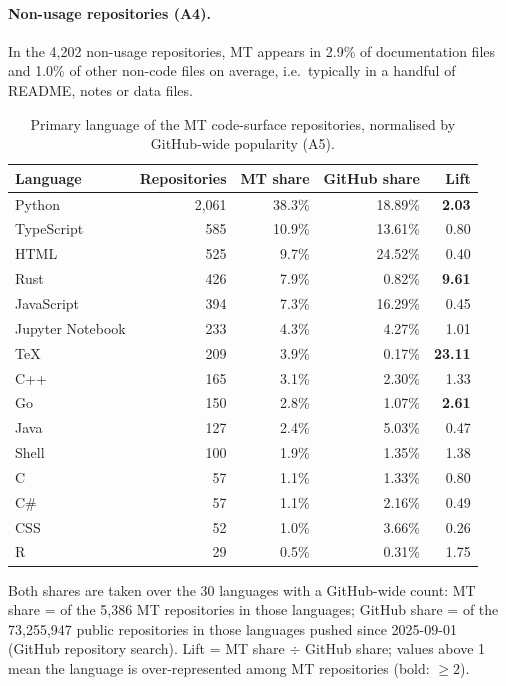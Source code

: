 \documentclass[11pt,a4paper]{article}
\begin{document}
\paragraph{Non-usage repositories (A4).} In the 4,202 non-usage repositories, MT appears in 2.9\% of documentation files and 1.0\% of other non-code files on average, i.e.\ typically in a handful of README, notes or data files.

\begin{table}[htbp]
\centering
\small
\caption{Primary language of the MT code-surface repositories, normalised by GitHub-wide popularity (A5).}
\label{tab:mt-a5}
\begin{tabular}{@{}lrrrr@{}}
\toprule
Language & Repositories & MT share & GitHub share & Lift \\
\midrule
Python & 2,061 & 38.3\% & 18.89\% & \textbf{2.03} \\
TypeScript & 585 & 10.9\% & 13.61\% & 0.80 \\
HTML & 525 & 9.7\% & 24.52\% & 0.40 \\
Rust & 426 & 7.9\% & 0.82\% & \textbf{9.61} \\
JavaScript & 394 & 7.3\% & 16.29\% & 0.45 \\
Jupyter Notebook & 233 & 4.3\% & 4.27\% & 1.01 \\
TeX & 209 & 3.9\% & 0.17\% & \textbf{23.11} \\
C++ & 165 & 3.1\% & 2.30\% & 1.33 \\
Go & 150 & 2.8\% & 1.07\% & \textbf{2.61} \\
Java & 127 & 2.4\% & 5.03\% & 0.47 \\
Shell & 100 & 1.9\% & 1.35\% & 1.38 \\
C & 57 & 1.1\% & 1.33\% & 0.80 \\
C\# & 57 & 1.1\% & 2.16\% & 0.49 \\
CSS & 52 & 1.0\% & 3.66\% & 0.26 \\
R & 29 & 0.5\% & 0.31\% & 1.75 \\
\bottomrule
\end{tabular}
\par\smallskip\parbox{0.94\linewidth}{\footnotesize Both shares are taken over the 30 languages with a GitHub-wide count: MT share = of the 5,386 MT repositories in those languages; GitHub share = of the 73,255,947 public repositories in those languages pushed since 2025-09-01 (GitHub repository search). Lift = MT share $\div$ GitHub share; values above 1 mean the language is over-represented among MT repositories (bold: $\geq 2$).}
\end{table}
\end{document}
